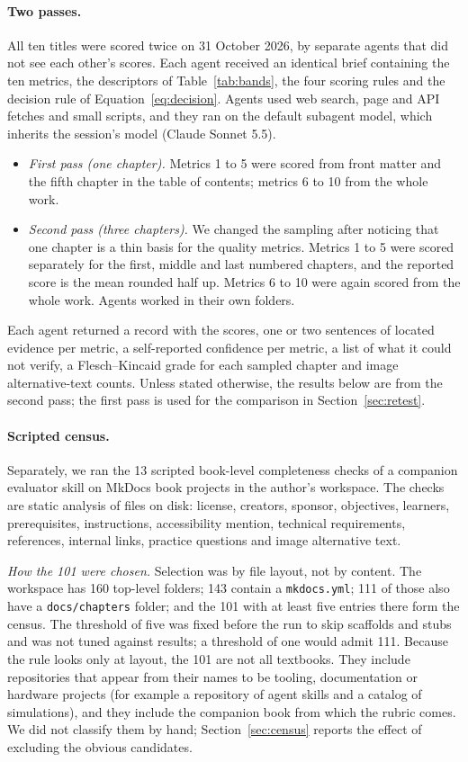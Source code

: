 \paragraph{Two passes.}
All ten titles were scored twice on 31 October 2026, by separate agents that did not see each other's scores. Each agent received an identical brief containing the ten metrics, the descriptors of Table~\ref{tab:bands}, the four scoring rules and the decision rule of Equation~\ref{eq:decision}. Agents used web search, page and API fetches and small scripts, and they ran on the default subagent model, which inherits the session's model (Claude Sonnet 5.5).
\begin{itemize}[leftmargin=*,itemsep=2pt]
  \item \emph{First pass (one chapter).} Metrics 1 to 5 were scored from front matter and the fifth chapter in the table of contents; metrics 6 to 10 from the whole work.
  \item \emph{Second pass (three chapters).} We changed the sampling after noticing that one chapter is a thin basis for the quality metrics. Metrics 1 to 5 were scored separately for the first, middle and last numbered chapters, and the reported score is the mean rounded half up. Metrics 6 to 10 were again scored from the whole work. Agents worked in their own folders.
\end{itemize}
Each agent returned a record with the scores, one or two sentences of located evidence per metric, a self-reported confidence per metric, a list of what it could not verify, a Flesch--Kincaid grade for each sampled chapter and image alternative-text counts. Unless stated otherwise, the results below are from the second pass; the first pass is used for the comparison in Section~\ref{sec:retest}.

\paragraph{Scripted census.}
Separately, we ran the 13 scripted book-level completeness checks of a companion evaluator skill \cite{oerevaluator} on MkDocs book projects in the author's workspace. The checks are static analysis of files on disk: license, creators, sponsor, objectives, learners, prerequisites, instructions, accessibility mention, technical requirements, references, internal links, practice questions and image alternative text.

\emph{How the 101 were chosen.} Selection was by file layout, not by content. The workspace has 160 top-level folders; 143 contain a \texttt{mkdocs.yml}; 111 of those also have a \texttt{docs/chapters} folder; and the 101 with at least five entries there form the census. The threshold of five was fixed before the run to skip scaffolds and stubs and was not tuned against results; a threshold of one would admit 111. Because the rule looks only at layout, the 101 are not all textbooks. They include repositories that appear from their names to be tooling, documentation or hardware projects (for example a repository of agent skills and a catalog of simulations), and they include the companion book from which the rubric comes. We did not classify them by hand; Section~\ref{sec:census} reports the effect of excluding the obvious candidates.

